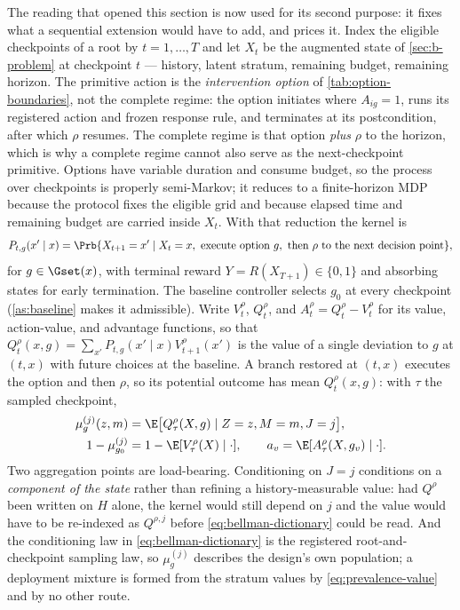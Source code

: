 The reading that opened this section is now used for its second purpose: it
fixes what a sequential extension would have to add, and prices it.  Index the
eligible checkpoints of a root by $t=1,\dots,T$ and let $X_t$ be the augmented
state of \cref{sec:b-problem} at checkpoint $t$ --- history, latent stratum,
remaining budget, remaining horizon.  The primitive action is the
\emph{intervention option} of \cref{tab:option-boundaries}, not the complete
regime: the option initiates where $A_{ig}=1$, runs its registered action and
frozen response rule, and terminates at its postcondition, after which $\rho$
resumes.  The complete regime is that option \emph{plus} $\rho$ to the horizon,
which is why a complete regime cannot also serve as the next-checkpoint
primitive.  Options have variable duration and consume budget, so the process
over checkpoints is properly semi-Markov; it reduces to a finite-horizon MDP
because the protocol fixes the eligible grid and because elapsed time and
remaining budget are carried inside $X_t$.  With that reduction the kernel is
\begin{equation}
 P_{t,g}(x'\mid x)=\Prb\{X_{t+1}=x'\mid X_t=x,\ \text{execute option }g,\ \text{then }\rho
 \text{ to the next decision point}\},
 \label{eq:checkpoint-kernel}
\end{equation}
for $g\in\Gset(x)$, with terminal reward $Y=R(X_{T+1})\in\{0,1\}$ and absorbing
states for early termination.  The baseline controller selects $g_0$ at every
checkpoint (\cref{as:baseline} makes it admissible).  Write $V^\rho_t$,
$Q^\rho_t$, and $A^\rho_t=Q^\rho_t-V^\rho_t$ for its value, action-value, and
advantage functions, so that
$Q^\rho_t(x,g)=\sum_{x'}P_{t,g}(x'\mid x)V^\rho_{t+1}(x')$ is the value of a
single deviation to $g$ at $(t,x)$ with future choices at the baseline.  A
branch restored at $(t,x)$ executes the option and then $\rho$, so its potential
outcome has mean $Q^\rho_t(x,g)$: with $\tau$ the sampled checkpoint,
\begin{equation}
 \begin{aligned}
 \mu^{(j)}_g(z,m)&=\E\big[Q^\rho_\tau(X,g)\mid Z=z,M=m,J=j\big],\\
 1-\mu^{(j)}_{g_0}&=1-\E[V^\rho_\tau(X)\mid\cdot],
 \qquad
 a_v=\E[A^\rho_\tau(X,g_v)\mid\cdot].
 \end{aligned}
 \label{eq:bellman-dictionary}
\end{equation}
Two aggregation points are load-bearing.  Conditioning on $J=j$ conditions on a
\emph{component of the state} rather than refining a history-measurable value:
had $Q^\rho$ been written on $H$ alone, the kernel would still depend on $j$ and
the value would have to be re-indexed as $Q^{\rho,j}$ before \eqref{eq:bellman-dictionary}
could be read.  And the conditioning law in \eqref{eq:bellman-dictionary} is the
registered root-and-checkpoint sampling law, so $\mu^{(j)}_g$ describes the
design's own population; a deployment mixture is formed from the stratum values
by \eqref{eq:prevalence-value} and by no other route.

